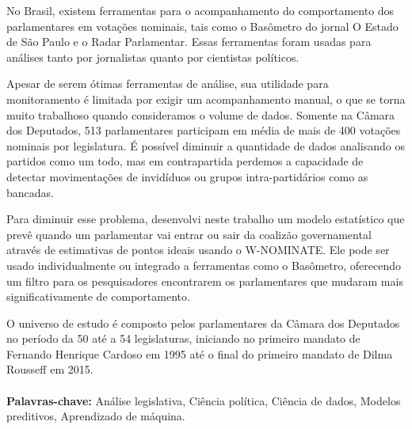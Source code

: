 No Brasil, existem ferramentas para o acompanhamento do comportamento dos
parlamentares em votações nominais, tais como o Basômetro do jornal O Estado de
São Paulo e o Radar Parlamentar. Essas ferramentas foram usadas para análises
tanto por jornalistas quanto por cientistas políticos.

Apesar de serem ótimas ferramentas de análise, sua utilidade para monitoramento
é limitada por exigir um acompanhamento manual, o que se torna muito trabalhoso
quando consideramos o volume de dados. Somente na Câmara dos Deputados, 513
parlamentares participam em média de mais de 400 votações nominais por
legislatura. É possível diminuir a quantidade de dados analisando os partidos
como um todo, mas em contrapartida perdemos a capacidade de detectar
movimentações de invidíduos ou grupos intra-partidários como as bancadas.

Para diminuir esse problema, desenvolvi neste trabalho um modelo estatístico
que prevê quando um parlamentar vai entrar ou sair da coalizão governamental
através de estimativas de pontos ideais usando o W-NOMINATE. Ele pode ser usado
individualmente ou integrado a ferramentas como o Basômetro, oferecendo um
filtro para os pesquisadores encontrarem os parlamentares que mudaram mais
significativamente de comportamento.

O universo de estudo é composto pelos parlamentares da Câmara dos Deputados no
período da 50\textordfeminine{} até a 54\textordfeminine{} legislaturas,
iniciando no primeiro mandato de Fernando Henrique Cardoso em 1995 até o final
do primeiro mandato de Dilma Rousseff em 2015.
\\
\\
\textbf{Palavras-chave:} Análise legislativa, Ciência política, Ciência de
dados, Modelos preditivos, Aprendizado de máquina.
